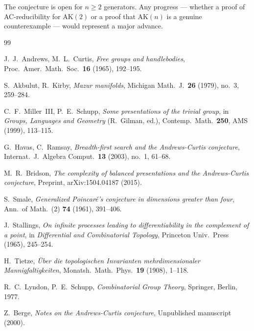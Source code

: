 \documentclass[12pt,a4paper]{amsart}
\theoremstyle{definition}
\theoremstyle{remark}
\begin{document}
The conjecture is open for $n \geq 2$ generators. Any progress — whether a proof
of AC-reducibility for $\mathrm{AK}(2)$ or a proof that $\mathrm{AK}(n)$ is a
genuine counterexample — would represent a major advance.

\begin{thebibliography}{99}

J.~J.\ Andrews, M.~L.\ Curtis,
\textit{Free groups and handlebodies},
Proc.\ Amer.\ Math.\ Soc.\ \textbf{16} (1965), 192--195.

S.~Akbulut, R.~Kirby,
\textit{Mazur manifolds},
Michigan Math.\ J.\ \textbf{26} (1979), no.\ 3, 259--284.

C.~F.\ Miller~III, P.~E.\ Schupp,
\textit{Some presentations of the trivial group},
in \textit{Groups, Languages and Geometry} (R.~Gilman, ed.),
Contemp.\ Math.\ \textbf{250}, AMS (1999), 113--115.

G.~Havas, C.~Ramsay,
\textit{Breadth-first search and the Andrews-Curtis conjecture},
Internat.\ J.\ Algebra Comput.\ \textbf{13} (2003), no.\ 1, 61--68.

M.~R.\ Bridson,
\textit{The complexity of balanced presentations and the Andrews-Curtis conjecture},
Preprint, arXiv:1504.04187 (2015).

S.~Smale,
\textit{Generalized Poincaré's conjecture in dimensions greater than four},
Ann.\ of Math.\ (2) \textbf{74} (1961), 391--406.

J.~Stallings,
\textit{On infinite processes leading to differentiability in the complement of
a point},
in \textit{Differential and Combinatorial Topology}, Princeton Univ.\ Press (1965),
245--254.

H.~Tietze,
\textit{Über die topologischen Invarianten mehrdimensionaler Mannigfaltigkeiten},
Monatsh.\ Math.\ Phys.\ \textbf{19} (1908), 1--118.

R.~C.\ Lyndon, P.~E.\ Schupp,
\textit{Combinatorial Group Theory},
Springer, Berlin, 1977.

Z.~Berge,
\textit{Notes on the Andrews-Curtis conjecture},
Unpublished manuscript (2000).

\end{thebibliography}
\end{document}
